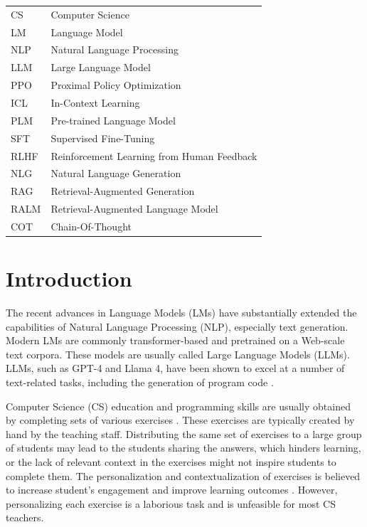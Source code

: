 \documentclass[english, 12pt, a4paper, sci, utf8, a-2b, online]{latex/definitions/aaltothesis}
\begin{document}
\begin{tabular}{ll}
CS      & Computer Science \\
LM      & Language Model \\
NLP     & Natural Language Processing \\
LLM     & Large Language Model \\
PPO     & Proximal Policy Optimization \\
ICL     & In-Context Learning \\
PLM     & Pre-trained Language Model \\
SFT     & Supervised Fine-Tuning \\
RLHF    & Reinforcement Learning from Human Feedback \\
NLG     & Natural Language Generation \\
RAG     & Retrieval-Augmented Generation \\
RALM    & Retrieval-Augmented Language Model \\
COT     & Chain-Of-Thought \\
\end{tabular}


\cleardoublepage

\section{Introduction}
\label{sec:intro}

\thispagestyle{empty}

The recent advances in Language Models (LMs) have substantially extended the capabilities of Natural Language Processing (NLP), especially text generation. Modern LMs are commonly transformer-based and pretrained on a Web-scale text corpora. These models are usually called Large Language Models (LLMs). LLMs, such as GPT-4 and Llama 4, have been shown to excel at a number of text-related tasks, including the generation of program code \cite{Minaee2024-fr}.

Computer Science (CS) education and programming skills are usually obtained by completing sets of various exercises \cite{10.1145/3501385.3543957}. These exercises are typically created by hand by the teaching staff. Distributing the same set of exercises to a large group of students may lead to the students sharing the answers, which hinders learning, or the lack of relevant context in the exercises might not inspire students to complete them. The personalization and contextualization of exercises 
is believed to increase student's engagement and improve learning outcomes \cite{10.1145/1869746.1869747}. However, personalizing each exercise is a laborious task and is unfeasible for most CS teachers.
\end{document}
